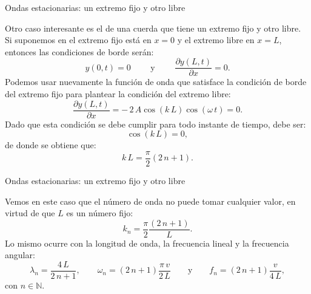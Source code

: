\documentclass[11pt,handout,aspectratio=1610]{beamer}
\newcommand{\pdiff}[2]{\frac{\partial #1}{\partial #2}}
\newcommand{\nn}{\mathbb{N}}
\begin{document}
\begin{frame}{Ondas estacionarias: un extremo fijo y otro libre}

    Otro caso interesante es el de una cuerda que tiene un extremo fijo y otro libre. Si suponemos en el extremo fijo está en $x=0$ y el extremo libre en $x=L$, entonces las condiciones de borde serán: $$ y \left(0,t\right) = 0 \qquad \text{ y } \qquad \pdiff{y \left(L,t\right)}{x} = 0. $$ Podemos usar nuevamente la función de onda que satisface la condición de borde del extremo fijo para plantear la condición del extremo libre: $$ \pdiff{y \left(L,t\right)}{x} = - \, 2 \, A \cos \left(k\, L\right) \cos \left(\omega \, t\right) = 0. $$ Dado que esta condición se debe cumplir para todo instante de tiempo, debe ser: $$ \cos \left(k\, L\right) = 0, $$ de donde se obtiene que: $$ k \, L = \frac{\pi}{2} \left( 2 \, n + 1\right). $$

\end{frame}

\begin{frame}{Ondas estacionarias: un extremo fijo y otro libre}

    Vemos en este caso que el número de onda no puede tomar cualquier valor, en virtud de que $L$ es un número fijo: $$ k_n = \frac{\pi}{2} \frac{\left( 2 \, n + 1\right)}{L}. $$ Lo mismo ocurre con la longitud de onda, la frecuencia lineal y la frecuencia angular: $$ \lambda_n = \frac{4 \, L}{2 \, n + 1}, \qquad \omega_n = \left(2 \, n + 1\right) \frac{\pi \, v}{2 \, L} \qquad \text{y} \qquad f_n = \left(2 \, n + 1\right) \frac{v}{4 \, L}, $$ con $n \in \nn$.

\end{frame}
\end{document}
